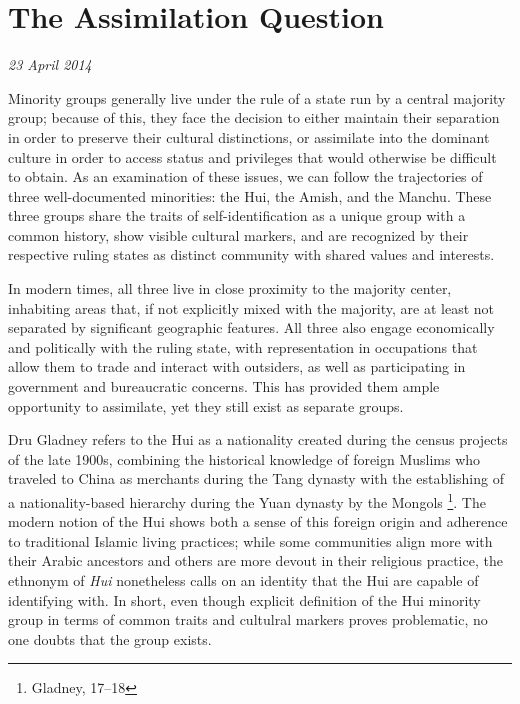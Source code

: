 \section{The Assimilation Question}

\textit{23 April 2014}

Minority groups generally live under the rule of a state run by a central
majority group; because of this, they face the decision to either maintain their
separation in order to preserve their cultural distinctions, or assimilate into
the dominant culture in order to access status and privileges that would
otherwise be difficult to obtain. As an examination of these issues, we can
follow the trajectories of three well-documented minorities: the Hui, the
Amish, and the Manchu. These three groups share the traits of
self-identification as a unique group with a common history, show visible
cultural markers, and are
recognized by their respective ruling states as distinct community with shared
values and interests.

In modern times, all three live in close proximity to the
majority center, inhabiting areas that, if not explicitly mixed with the
majority, are at least not separated by significant geographic features. All
three also engage economically and politically with the ruling state, with
representation in occupations that allow them to trade and interact with
outsiders, as well as participating in government and bureaucratic concerns.
This has provided them ample opportunity to assimilate, yet they still exist as
separate groups.

Dru Gladney refers to the Hui as a nationality created during the census
projects of the late 1900s, combining the historical knowledge of foreign
Muslims who traveled to China as merchants during the Tang dynasty with the
establishing of a nationality-based hierarchy during the Yuan dynasty by the Mongols
\footnote{Gladney, 17--18}. The modern notion of the Hui shows both a sense of
this foreign origin and adherence to traditional Islamic living practices; while some
communities align more with their Arabic ancestors and others are more devout
in their religious practice, the ethnonym of \textit{Hui} nonetheless calls on
an identity that the Hui are capable of identifying with. In short, even though
explicit definition of the Hui minority group in terms of common traits and
cultulral markers proves problematic, no one doubts that the group exists.

